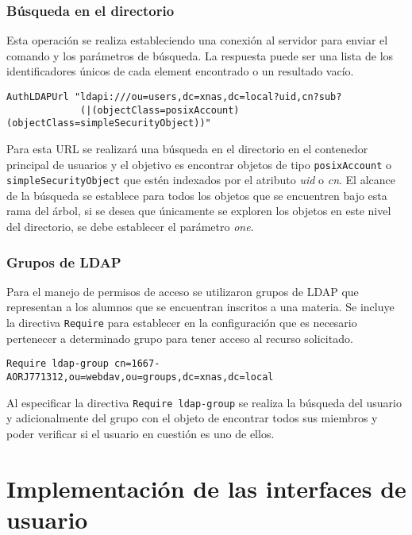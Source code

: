         \subsubsection {B\'{u}squeda en el directorio}

Esta operaci\'{o}n se realiza estableciendo una conexi\'{o}n al servidor para enviar el comando y los par\'{a}metros de b\'{u}squeda. La respuesta puede ser una lista de los identificadores \'{u}nicos de cada element encontrado o un resultado vac\'{i}o.

{
\scriptsize
\linespread{1}
\begin{verbatim}
AuthLDAPUrl "ldapi:///ou=users,dc=xnas,dc=local?uid,cn?sub?
             (|(objectClass=posixAccount)(objectClass=simpleSecurityObject))"
\end{verbatim}
}


Para esta URL se realizar\'{a} una b\'{u}squeda en el directorio en el contenedor principal de usuarios y el objetivo es encontrar objetos de tipo \texttt{posixAccount} o \texttt{simpleSecurityObject} que est\'{e}n indexados por el atributo \textsl{uid} o \textsl{cn}. El alcance de la b\'{u}squeda se establece para todos los objetos que se encuentren bajo esta rama del \'{a}rbol, si se desea que \'{u}nicamente se exploren los objetos en este nivel del directorio, se debe establecer el par\'{a}metro \textsl{one}.

        \subsubsection {Grupos de \textsc{LDAP}}

Para el manejo de permisos de acceso se utilizaron grupos de \textsc{LDAP} que representan a los alumnos que se encuentran inscritos a una materia. Se incluye la directiva \texttt{Require} para establecer en la configuraci\'{o}n que es necesario pertenecer a determinado grupo para tener acceso al recurso solicitado.

{
\scriptsize
\linespread{1}
\begin{verbatim}
Require ldap-group cn=1667-AORJ771312,ou=webdav,ou=groups,dc=xnas,dc=local
\end{verbatim}
}

Al especificar la directiva \texttt{Require ldap-group} se realiza la b\'{u}squeda del usuario y adicionalmente del grupo con el objeto de encontrar todos sus miembros y poder verificar si el usuario en cuesti\'{o}n es uno de ellos.


    \section {Implementaci\'{o}n de las interfaces de usuario}

